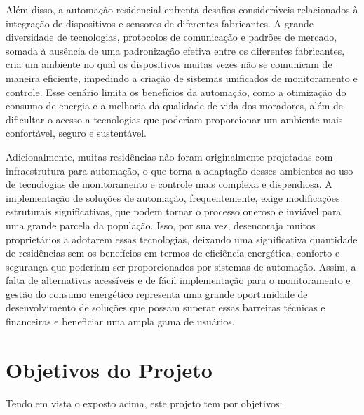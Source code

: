 Além disso, a automação residencial enfrenta desafios consideráveis relacionados à integração de dispositivos e sensores de diferentes fabricantes. A grande diversidade de tecnologias, protocolos de comunicação e padrões de mercado, somada à ausência de uma padronização efetiva entre os diferentes fabricantes, cria um ambiente no qual os dispositivos muitas vezes não se comunicam de maneira eficiente, impedindo a criação de sistemas unificados de monitoramento e controle. Esse cenário limita os benefícios da automação, como a otimização do consumo de energia e a melhoria da qualidade de vida dos moradores, além de dificultar o acesso a tecnologias que poderiam proporcionar um ambiente mais confortável, seguro e sustentável.

Adicionalmente, muitas residências não foram originalmente projetadas com infraestrutura para automação, o que torna a adaptação desses ambientes ao uso de tecnologias de monitoramento e controle mais complexa e dispendiosa. A implementação de soluções de automação, frequentemente, exige modificações estruturais significativas, que podem tornar o processo oneroso e inviável para uma grande parcela da população. Isso, por sua vez, desencoraja muitos proprietários a adotarem essas tecnologias, deixando uma significativa quantidade de residências sem os benefícios em termos de eficiência energética, conforto e segurança que poderiam ser proporcionados por sistemas de automação. Assim, a falta de alternativas acessíveis e de fácil implementação para o monitoramento e gestão do consumo energético representa uma grande oportunidade de desenvolvimento de soluções que possam superar essas barreiras técnicas e financeiras e beneficiar uma ampla gama de usuários.

\section{Objetivos do Projeto}
\label{sec:objetivos}

Tendo em vista o exposto acima, este projeto tem por objetivos:

